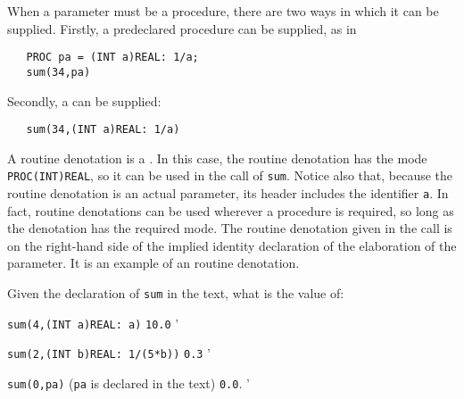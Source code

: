 When a parameter must be a procedure, there are two ways in which it
can be supplied. Firstly, a predeclared procedure
 can be supplied, as in
\begin{verbatim}
   PROC pa = (INT a)REAL: 1/a;
   sum(34,pa)
\end{verbatim}
\noindent
Secondly, a  can be
supplied:
\begin{verbatim}
   sum(34,(INT a)REAL: 1/a)
\end{verbatim}
\noindent
A routine denotation is a .  In this case, the routine
denotation has the mode \verb|PROC(INT)REAL|, so it can be used in
the call of \verb|sum|.  Notice also that, because the routine
denotation is an actual parameter, its header includes the identifier
\verb|a|.  In fact, routine denotations can be used wherever a
procedure is required, so long as the denotation has the required
mode.  The routine denotation given in the call is on the right-hand
side of the implied identity declaration of the elaboration of the
parameter.  It is an example of an  routine
denotation.

\begin{exercise}
\item Given the declaration of \verb|sum| in the text, what is
the value of:
\begin{subex}
\item \verb|sum(4,(INT a)REAL: a)| \subans \verb|10.0|
'
\item \verb|sum(2,(INT b)REAL: 1/(5*b))| \subans \verb|0.3|
'
\item \verb|sum(0,pa)| (\verb|pa| is declared in the text) \subans
\verb|0.0|.
'
\end{subex}
\end{exercise}

